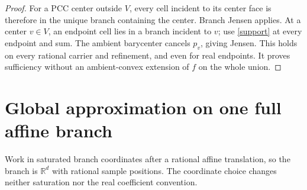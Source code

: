 \documentclass[11pt]{article}
\newcommand{\R}{\mathbb R}
\begin{document}
\begin{proof}
For a PCC center outside $V$, every cell incident to its center face is therefore in the unique branch containing the center. Branch Jensen applies. At a center $v\in V$, an endpoint cell lies in a branch incident to $v$; use \eqref{support} at every endpoint and sum. The ambient barycenter cancels $p_v$, giving Jensen. This holds on every rational carrier and refinement, and even for real endpoints. It proves sufficiency without an ambient-convex extension of $f$ on the whole union.
\end{proof}

\section{Global approximation on one full affine branch}
Work in saturated branch coordinates after a rational affine translation, so the branch is $\R^d$ with rational sample positions. The coordinate choice changes neither saturation nor the real coefficient convention.
\end{document}
